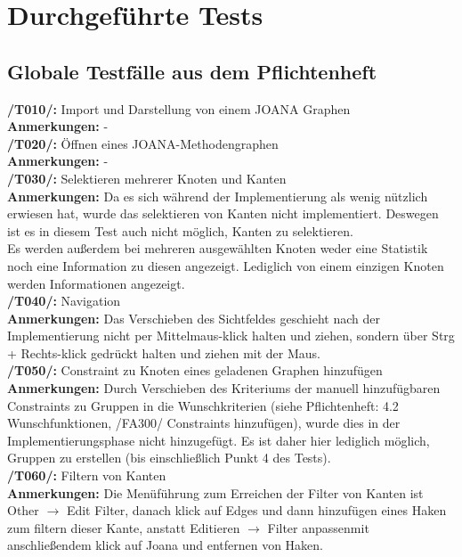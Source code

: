 \chapter{Durchgeführte Tests}
\label{ch:durchgefuehrtetests}

\section{Globale Testfälle aus dem Pflichtenheft}

\textbf{/T010/: }Import und Darstellung von einem JOANA Graphen\\
\textbf{Anmerkungen: }-\\

\textbf{/T020/: }Öffnen eines JOANA-Methodengraphen\\
\textbf{Anmerkungen: }-\\

\textbf{/T030/: }Selektieren mehrerer Knoten und Kanten\\
\textbf{Anmerkungen: }Da es sich während der Implementierung als wenig nützlich erwiesen hat, wurde das selektieren von Kanten nicht implementiert. Deswegen ist es in diesem Test auch nicht möglich, Kanten zu selektieren.\\
	Es werden außerdem bei mehreren ausgewählten Knoten weder eine Statistik noch eine Information zu diesen angezeigt. Lediglich von einem einzigen Knoten werden Informationen angezeigt.\\

\textbf{/T040/: }Navigation\\
\textbf{Anmerkungen: }Das Verschieben des Sichtfeldes geschieht nach der Implementierung nicht per Mittelmaus-klick halten und ziehen, sondern über Strg + Rechts-klick gedrückt halten und ziehen mit der Maus.\\

\textbf{/T050/: }Constraint zu Knoten eines geladenen Graphen hinzufügen\\
\textbf{Anmerkungen: }Durch Verschieben des Kriteriums der manuell hinzufügbaren Constraints zu Gruppen in die Wunschkriterien (siehe Pflichtenheft: 4.2 Wunschfunktionen, /FA300/ Constraints hinzufügen), wurde dies in der Implementierungsphase nicht hinzugefügt. Es ist daher hier lediglich möglich, Gruppen zu erstellen (bis einschließlich Punkt 4 des Tests).\\

\textbf{/T060/: }Filtern von Kanten\\
\textbf{Anmerkungen: }Die Menüführung zum Erreichen der Filter von Kanten ist \glqq{}Other $\to$ Edit Filter\grqq, danach klick auf Edges und dann hinzufügen eines Haken zum filtern dieser Kante, anstatt \glqq{}Editieren $\to$ Filter anpassen\grqq mit anschließendem klick auf Joana und entfernen von Haken.\\

